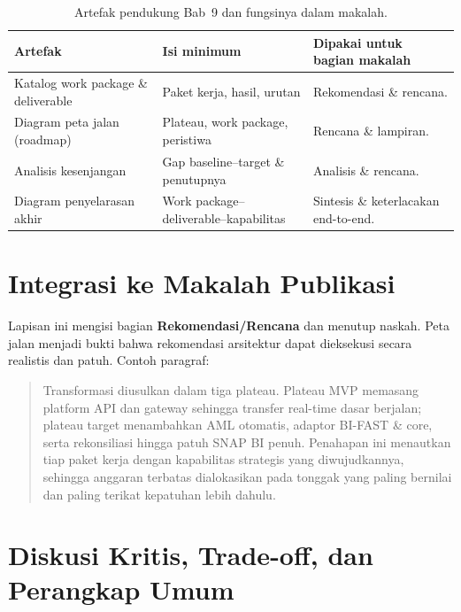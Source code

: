 \begin{table}[htbp]
\centering
\scriptsize
\caption{Artefak pendukung Bab~9 dan fungsinya dalam makalah.}
\label{tab:artefak-bab8-impl}
\begin{tabularx}{\textwidth}{@{}p{} p{} X@{}}
\hline
\textbf{Artefak} & \textbf{Isi minimum} & \textbf{Dipakai untuk bagian makalah} \\
\hline
Katalog work package \& deliverable & Paket kerja, hasil, urutan & Rekomendasi \&
rencana. \\
Diagram peta jalan (roadmap) & Plateau, work package, peristiwa & Rencana \&
lampiran. \\
Analisis kesenjangan & Gap baseline--target \& penutupnya & Analisis \& rencana. \\
Diagram penyelarasan akhir & Work package--deliverable--kapabilitas & Sintesis \&
keterlacakan end-to-end. \\
\hline
\end{tabularx}
\end{table}

\section{Integrasi ke Makalah Publikasi}

Lapisan ini mengisi bagian \textbf{Rekomendasi/Rencana} dan menutup naskah. Peta
jalan menjadi bukti bahwa rekomendasi arsitektur dapat dieksekusi secara realistis
dan patuh. Contoh paragraf:

\begin{quote}
Transformasi diusulkan dalam tiga plateau. Plateau MVP memasang platform API dan
gateway sehingga transfer real-time dasar berjalan; plateau target menambahkan AML
otomatis, adaptor BI-FAST \& core, serta rekonsiliasi hingga patuh SNAP BI penuh.
Penahapan ini menautkan tiap paket kerja dengan kapabilitas strategis yang
diwujudkannya, sehingga anggaran terbatas dialokasikan pada tonggak yang paling
bernilai dan paling terikat kepatuhan lebih dahulu.
\end{quote}

\section{Diskusi Kritis, Trade-off, dan Perangkap Umum}

